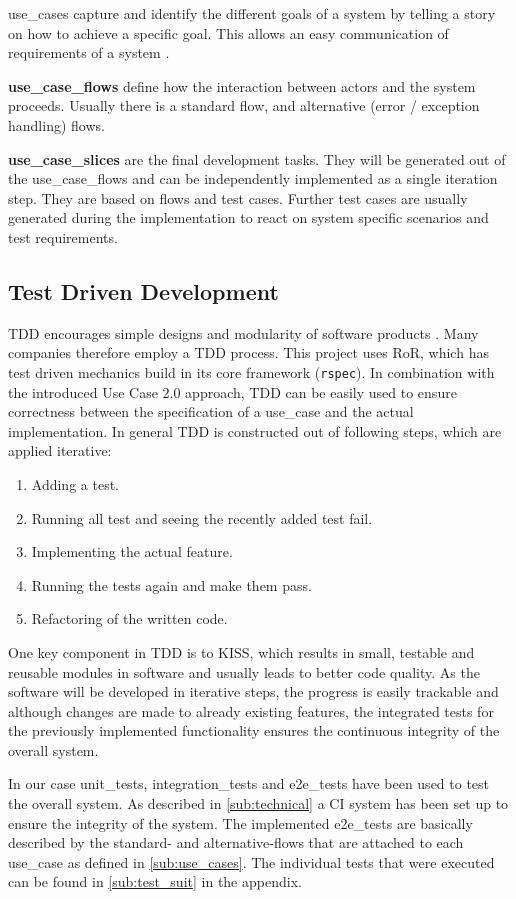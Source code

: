 \Glspl{use_case} capture and identify the different goals of a system by telling a story on how to achieve a specific goal. This allows an easy communication of requirements of a system \cite{jacobson2011usecase}.

\textbf{\Glspl{use_case_flow}} define how the interaction between actors and the system proceeds. Usually there is a standard flow, and alternative (error / exception handling) flows. 

\textbf{\Glspl{use_case_slice}} are the final development tasks. They will be generated out of the \glspl{use_case_flow} and can be independently implemented as a single iteration step. They are based on flows and test cases. Further test cases are usually generated during the implementation to react on system specific scenarios and test requirements.


\subsection{Test Driven Development}
\label{sec:tdd}
\Gls{TDD} encourages simple designs and modularity of software products \cite{tdd}. Many companies therefore employ a \gls{TDD} process. This project uses \gls{RoR}, which has test driven mechanics build in its core framework (\texttt{rspec}). In combination with the introduced Use Case 2.0 approach, \gls{TDD} can be easily used to ensure correctness between the specification of a \gls{use_case} and the actual implementation. In general \gls{TDD} is constructed out of following steps, which are applied iterative: 

\begin{enumerate}
	\item Adding a test.
	\item Running all test and seeing the recently added test fail.
	\item Implementing the actual feature.
	\item Running the tests again and make them pass.
	\item Refactoring of the written code.
\end{enumerate}


One key component in \gls{TDD} is to \gls{KISS}, which results in small, testable and reusable modules in software and usually leads to better code quality. As the software will be developed in iterative steps, the progress is easily trackable and although changes are made to already existing features, the integrated tests for the previously implemented functionality ensures the continuous integrity of the overall system.  

In our case \glspl{unit_test}, \glspl{integration_test} and \glspl{e2e_test} have been used to test the overall system. As described in \autoref{sub:technical} a \gls{CI} system has been set up to ensure the integrity of the system. The implemented \glspl{e2e_test} are basically described by the standard- and alternative-flows that are attached to each \gls{use_case} as defined in \autoref{sub:use_cases}. The individual tests that were executed can be found in \autoref{sub:test_suit} in the appendix.


